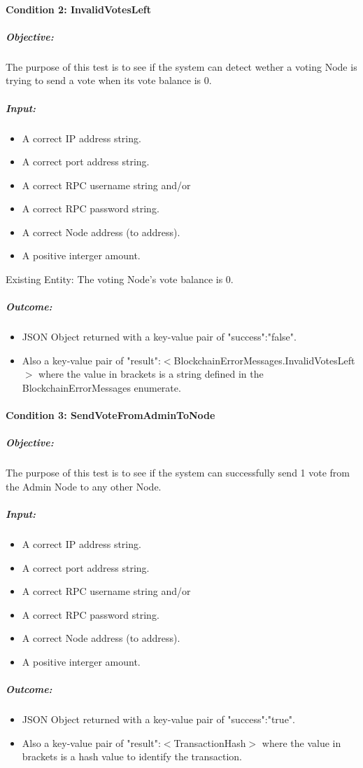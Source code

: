 \documentclass[11pt]{article}
\begin{document}
	\paragraph{Condition 2: InvalidVotesLeft}	
	\subparagraph{Objective:}
	The purpose of this test is to see if the system can detect wether a voting Node is trying to send a vote when its vote balance is 0.
	\subparagraph{Input:}
	\begin{itemize}
		\item A correct IP address string.
		\item A correct port address string.
		\item A correct RPC username string and/or
		\item A correct RPC password string.
		\item A correct Node address (to address).
		\item A positive interger amount.
	\end{itemize}
	Existing Entity: The voting Node's vote balance is 0.
	\subparagraph{Outcome:}
	\begin{itemize}
		\item JSON Object returned with a key-value pair of "success":"false".
		\item Also a key-value pair of "result":$<$BlockchainErrorMessages.InvalidVotesLeft$>$ where the value in brackets is a string defined in the BlockchainErrorMessages enumerate.
	\end{itemize}
	
	\paragraph{Condition 3: SendVoteFromAdminToNode}	
	\subparagraph{Objective:}
	The purpose of this test is to see if the system can successfully send 1 vote from the Admin Node to any other Node.
	\subparagraph{Input:}
	\begin{itemize}
		\item A correct IP address string.
		\item A correct port address string.
		\item A correct RPC username string and/or
		\item A correct RPC password string.
		\item A correct Node address (to address).
		\item A positive interger amount.
	\end{itemize}
	\subparagraph{Outcome:}
	\begin{itemize}
		\item JSON Object returned with a key-value pair of "success":"true".
		\item Also a key-value pair of "result":$<$TransactionHash$>$ where the value in brackets is a hash value to identify the transaction.
	\end{itemize}
	
\end{document}
